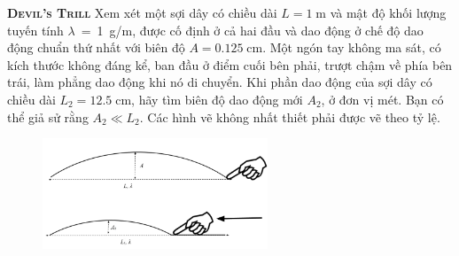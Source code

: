 




\begin{problem}{\textbf{\textsc{Devil's Trill}}}
	Xem xét một sợi dây có chiều dài $L=1\;\mathrm{m}$ và mật độ khối lượng tuyến tính $\lambda$\ =\ 1\ g/m, được cố định ở cả hai đầu và dao động ở chế độ dao động chuẩn thứ nhất với biên độ $A = 0.125 \; \mathrm{cm}$. Một ngón tay không ma sát, có kích thước không đáng kể, ban đầu ở điểm cuối bên phải, trượt chậm về phía bên trái, làm phẳng dao động khi nó di chuyển. Khi phần dao động của sợi dây có chiều dài $L_2=12.5\;\mathrm{cm}$, hãy tìm biên độ dao động mới $A_2$, ở đơn vị mét. Bạn có thể giả sử rằng $A_2\ll L_2$. Các hình vẽ không nhất thiết phải được vẽ theo tỷ lệ. 
	
	\FloatBarrier
	\begin{figure}[!htbp]
		\centering
		\includegraphics[width=0.6\textwidth]{problems/figures/devilTrill.png}
	\end{figure}
	\FloatBarrier
	
	
	
\end{problem}